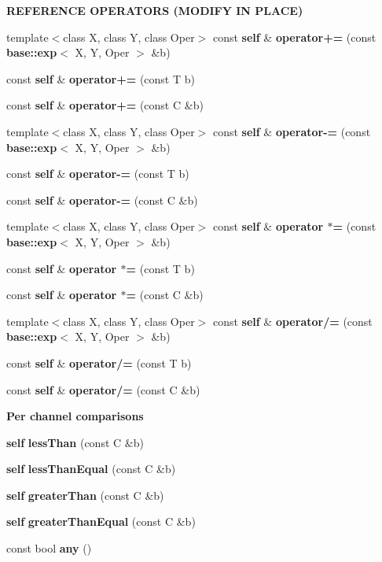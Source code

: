 \begin{Indent}{\bf REFERENCE OPERATORS (MODIFY IN PLACE)}\par
\begin{CompactItemize}
\item 
template$<$class X, class Y, class Oper$>$ const {\bf self} \& {\bf operator+=} (const {\bf base::exp}$<$ X, Y, Oper $>$ \&b)
\item 
const {\bf self} \& {\bf operator+=} (const T b)
\item 
const {\bf self} \& {\bf operator+=} (const C \&b)
\item 
template$<$class X, class Y, class Oper$>$ const {\bf self} \& {\bf operator-=} (const {\bf base::exp}$<$ X, Y, Oper $>$ \&b)
\item 
const {\bf self} \& {\bf operator-=} (const T b)
\item 
const {\bf self} \& {\bf operator-=} (const C \&b)
\item 
template$<$class X, class Y, class Oper$>$ const {\bf self} \& {\bf operator $\ast$=} (const {\bf base::exp}$<$ X, Y, Oper $>$ \&b)
\item 
const {\bf self} \& {\bf operator $\ast$=} (const T b)
\item 
const {\bf self} \& {\bf operator $\ast$=} (const C \&b)
\item 
template$<$class X, class Y, class Oper$>$ const {\bf self} \& {\bf operator/=} (const {\bf base::exp}$<$ X, Y, Oper $>$ \&b)
\item 
const {\bf self} \& {\bf operator/=} (const T b)
\item 
const {\bf self} \& {\bf operator/=} (const C \&b)
\end{CompactItemize}
\end{Indent}
\begin{Indent}{\bf Per channel comparisons}\par
\begin{CompactItemize}
\item 
{\bf self} {\bf less\-Than} (const C \&b)
\item 
{\bf self} {\bf less\-Than\-Equal} (const C \&b)
\item 
{\bf self} {\bf greater\-Than} (const C \&b)
\item 
{\bf self} {\bf greater\-Than\-Equal} (const C \&b)
\item 
const bool {\bf any} ()
\end{CompactItemize}
\end{Indent}

